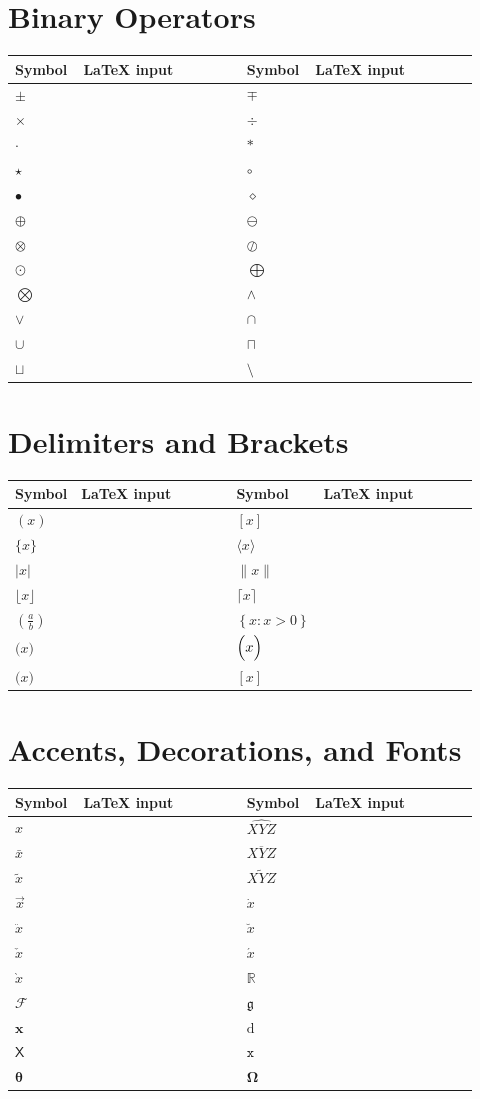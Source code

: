 \documentclass[10pt]{article}
\newcommand{\code}[1]{\texttt{\detokenize{#1}}}
\newcommand{\srow}[4]{$#1$ & \code{#2} & $#3$ & \code{#4}\\}
\newenvironment{symtable}
{\small\begin{longtable}{
  >{\centering\arraybackslash}p{0.12\linewidth}
  >{\raggedright\arraybackslash}p{0.34\linewidth}
  >{\centering\arraybackslash}p{0.12\linewidth}
  >{\raggedright\arraybackslash}p{0.34\linewidth}}
  \toprule
  \textbf{Symbol} & \textbf{LaTeX input} &
  \textbf{Symbol} & \textbf{LaTeX input}\\
  \midrule
  \endhead}
{\bottomrule\end{longtable}}
\begin{document}
\section*{Binary Operators}

\begin{symtable}
\srow{\pm}{\pm}{\mp}{\mp}
\srow{\times}{\times}{\div}{\div}
\srow{\cdot}{\cdot}{\ast}{\ast}
\srow{\star}{\star}{\circ}{\circ}
\srow{\bullet}{\bullet}{\diamond}{\diamond}
\srow{\oplus}{\oplus}{\ominus}{\ominus}
\srow{\otimes}{\otimes}{\oslash}{\oslash}
\srow{\odot}{\odot}{\bigoplus}{\bigoplus}
\srow{\bigotimes}{\bigotimes}{\wedge}{\wedge}
\srow{\vee}{\vee}{\cap}{\cap}
\srow{\cup}{\cup}{\sqcap}{\sqcap}
\srow{\sqcup}{\sqcup}{\setminus}{\setminus}
\end{symtable}

\section*{Delimiters and Brackets}

\begin{symtable}
\srow{(x)}{(x)}{[x]}{[x]}
\srow{\{x\}}{\{x\}}{\langle x\rangle}{\langle x\rangle}
\srow{|x|}{|x|}{\|x\|}{\|x\|}
\srow{\lfloor x\rfloor}{\lfloor x\rfloor}{\lceil x\rceil}{\lceil x\rceil}
\srow{\left(\frac{a}{b}\right)}{\left(\frac{a}{b}\right)}{\left\{x: x>0\right\}}{\left\{x: x>0\right\}}
\srow{\bigl( x \bigr)}{\bigl( x \bigr)}{\Bigl( x \Bigr)}{\Bigl( x \Bigr)}
\srow{\biggl( x \biggr)}{\biggl( x \biggr)}{\left[ x \right]}{\left[ x \right]}
\end{symtable}

\section*{Accents, Decorations, and Fonts}

\begin{symtable}
\srow{\hat{x}}{\hat{x}}{\widehat{XYZ}}{\widehat{XYZ}}
\srow{\bar{x}}{\bar{x}}{\overline{XYZ}}{\overline{XYZ}}
\srow{\tilde{x}}{\tilde{x}}{\widetilde{XYZ}}{\widetilde{XYZ}}
\srow{\vec{x}}{\vec{x}}{\dot{x}}{\dot{x}}
\srow{\ddot{x}}{\ddot{x}}{\breve{x}}{\breve{x}}
\srow{\check{x}}{\check{x}}{\acute{x}}{\acute{x}}
\srow{\grave{x}}{\grave{x}}{\mathbb{R}}{\mathbb{R}}
\srow{\mathcal{F}}{\mathcal{F}}{\mathfrak{g}}{\mathfrak{g}}
\srow{\mathbf{x}}{\mathbf{x}}{\mathrm{d}}{\mathrm{d}}
\srow{\mathsf{X}}{\mathsf{X}}{\mathtt{x}}{\mathtt{x}}
\srow{\bm{\theta}}{\bm{\theta}}{\boldsymbol{\Omega}}{\boldsymbol{\Omega}}
\end{symtable}
\end{document}
